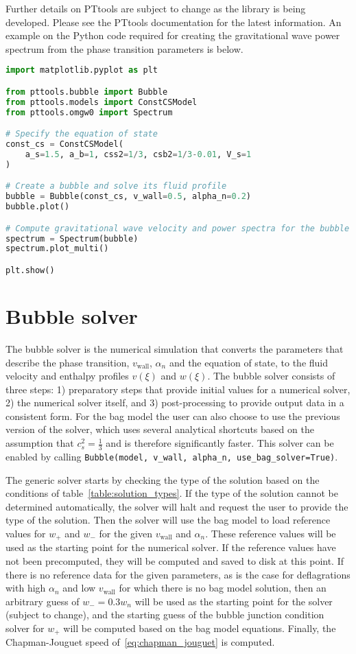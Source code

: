 Further details on PTtools are subject to change as the library is being developed.
Please see the PTtools documentation for the latest information.
An example on the Python code required for creating the gravitational wave power spectrum from the phase transition parameters is below.

\lstset{breaklines=true}
\begin{lstlisting}[language=Python]
import matplotlib.pyplot as plt

from pttools.bubble import Bubble
from pttools.models import ConstCSModel
from pttools.omgw0 import Spectrum

# Specify the equation of state
const_cs = ConstCSModel(
    a_s=1.5, a_b=1, css2=1/3, csb2=1/3-0.01, V_s=1
)

# Create a bubble and solve its fluid profile
bubble = Bubble(const_cs, v_wall=0.5, alpha_n=0.2)
bubble.plot()

# Compute gravitational wave velocity and power spectra for the bubble
spectrum = Spectrum(bubble)
spectrum.plot_multi()

plt.show()
\end{lstlisting}


\section{Bubble solver}
The bubble solver is the numerical simulation that converts the parameters that describe the phase transition, $v_{\text{wall}}$, $\alpha_n$ and the equation of state, to the fluid velocity and enthalpy profiles $v(\xi)$ and $w(\xi)$.
The bubble solver consists of three steps:
1) preparatory steps that provide initial values for a numerical solver,
2) the numerical solver itself, and
3) post-processing to provide output data in a consistent form.
For the bag model the user can also choose to use the previous version of the solver,
which uses several analytical shortcuts based on the assumption that $c_s^2 = \frac{1}{3}$ and is therefore significantly faster.
This solver can be enabled by calling \verb|Bubble(model, v_wall, alpha_n, use_bag_solver=True)|.

The generic solver starts by checking the type of the solution based on the conditions of table~\ref{table:solution_types}.
If the type of the solution cannot be determined automatically, the solver will halt and request the user to provide the type of the solution.
Then the solver will use the bag model to load reference values for $w_+$ and $w_-$ for the given $v_\text{wall}$ and $\alpha_n$.
These reference values will be used as the starting point for the numerical solver.
If the reference values have not been precomputed,
they will be computed and saved to disk at this point.
If there is no reference data for the given parameters,
as is the case for deflagrations with high $\alpha_n$ and low $v_\text{wall}$ for which there is no bag model solution,
then an arbitrary guess of $w_- = 0.3 w_n$ will be used as the starting point for the solver (subject to change),
and the starting guess of the bubble junction condition solver for $w_+$ will be computed based on the bag model equations.
Finally, the Chapman-Jouguet speed of~\eqref{eq:chapman_jouguet} is computed.

